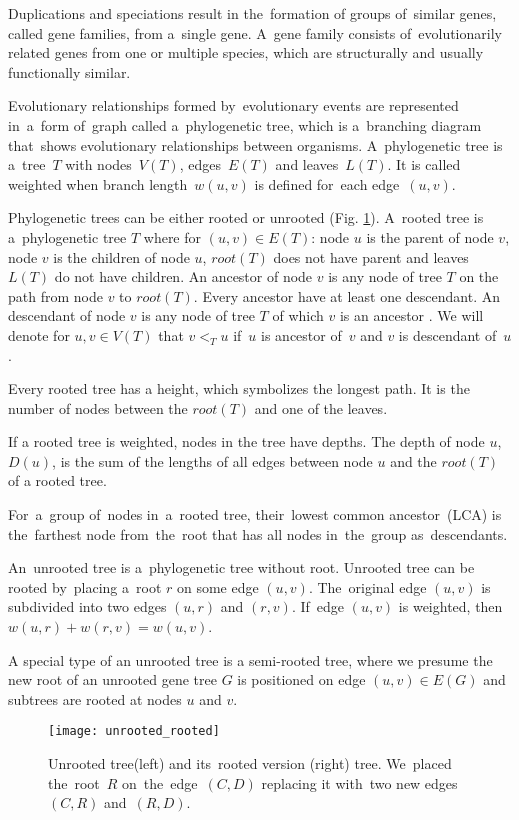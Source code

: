 Duplications and speciations result in the~formation of groups of~similar genes, called gene families, from a~single gene. A~gene family consists of~evolutionarily related genes from one or multiple species, which are structurally and usually functionally similar.

Evolutionary relationships formed by~evolutionary events are represented in~a~form of~graph called a~phylogenetic tree, which is a~branching diagram that~shows evolutionary relationships between organisms. A~phylogenetic tree is a~tree~$T$ with nodes~$V(T)$, edges~$E(T)$ and leaves~$L(T)$. It is called weighted when branch length~$w(u, v)$ is defined for~each edge~$(u, v)$.

Phylogenetic trees can be either rooted or unrooted (Fig. \ref{unrooted_rooted}). A~rooted tree is a~phylogenetic tree $T$ where for $(u, v) \in E(T)$: node $u$ is the parent of node $v$, node $v$ is the children of node $u$, $root(T)$ does not have parent and leaves $L(T)$ do not have children. An ancestor of node $v$ is any node of tree $T$ on the path from node $v$ to $root(T)$. Every ancestor have at least one descendant. An descendant of node $v$ is any node of tree $T$ of which $v$ is an ancestor \cite{hasic}. We will denote for $u, v \in V(T)$ that $v<_Tu$ if~$u$ is ancestor of~$v$ and $v$ is descendant of~$u$.

Every rooted tree has a height, which symbolizes the longest path. It is the number of nodes between the $root(T)$ and one of the leaves. 

If a rooted tree is weighted, nodes in the tree have depths. The depth of node $u$, $D(u)$, is the sum of the lengths of all edges between node $u$ and the $root(T)$ of a rooted tree.

For~a~group of~nodes in~a~rooted tree, their~lowest common ancestor~(LCA) is the~farthest node from~the~root that has all nodes in~the~group as~descendants.

An~unrooted tree is a~phylogenetic tree without root. Unrooted tree can be rooted by~placing a~root $r$ on some edge $(u, v)$. The~original edge $(u, v)$ is subdivided into two edges $(u, r)$ and $(r, v)$. If~edge $(u, v)$ is weighted, then $w(u, r) + w(r, v) = w(u, v)$.

A special type of an unrooted tree is a semi-rooted tree, where we presume the new root of an unrooted gene tree $G$ is positioned on edge $(u, v) \in E(G)$ and subtrees are rooted at nodes $u$ and $v$.

\begin{figure}[ht]
	\centering
	\label{unrooted_rooted}
  	\texttt{[image: unrooted\_rooted]}
  	\caption[Unrooted tree and its~rooted version]{Unrooted tree(left) and its~rooted version (right) tree. We~placed the~root~$R$ on~the~edge~$(C, D)$ replacing it with~two new edges~$(C, R)$ and~$(R, D)$.}
\end{figure}

